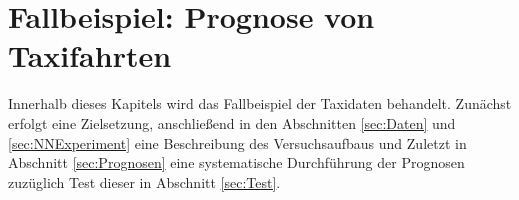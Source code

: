 \chapter{Fallbeispiel: Prognose von Taxifahrten}
\label{cha:Taxis} \label{cha:Experiment}
Innerhalb dieses Kapitels wird das Fallbeispiel der Taxidaten behandelt. Zunächst erfolgt eine Zielsetzung, anschließend in den Abschnitten \ref{sec:Daten} und \ref{sec:NNExperiment} eine Beschreibung des Versuchsaufbaus und Zuletzt in Abschnitt \ref{sec:Prognosen} eine systematische Durchführung der Prognosen zuzüglich Test dieser in Abschnitt \ref{sec:Test}. 




